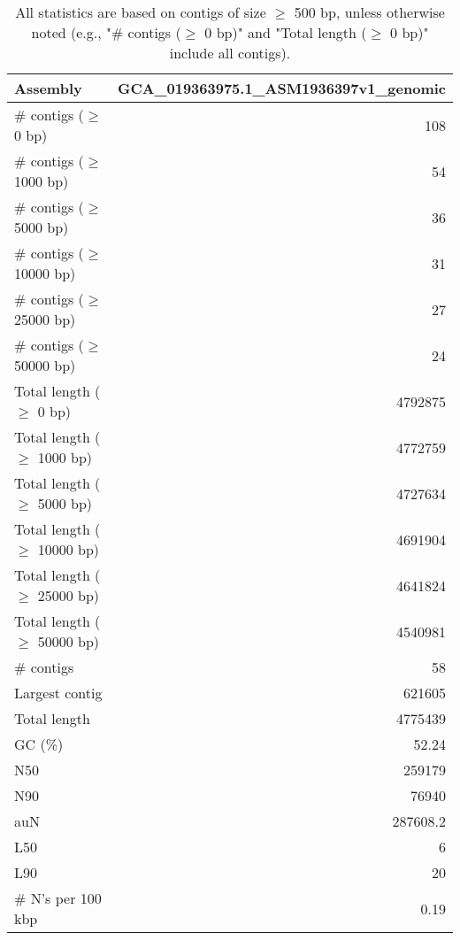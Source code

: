 \documentclass[12pt,a4paper]{article}
\begin{document}
\begin{table}[ht]
\begin{center}
\caption{All statistics are based on contigs of size $\geq$ 500 bp, unless otherwise noted (e.g., "\# contigs ($\geq$ 0 bp)" and "Total length ($\geq$ 0 bp)" include all contigs).}
\begin{tabular}{|l*{1}{|r}|}
\hline
Assembly & GCA\_019363975.1\_ASM1936397v1\_genomic \\ \hline
\# contigs ($\geq$ 0 bp) & 108 \\ \hline
\# contigs ($\geq$ 1000 bp) & 54 \\ \hline
\# contigs ($\geq$ 5000 bp) & 36 \\ \hline
\# contigs ($\geq$ 10000 bp) & 31 \\ \hline
\# contigs ($\geq$ 25000 bp) & 27 \\ \hline
\# contigs ($\geq$ 50000 bp) & 24 \\ \hline
Total length ($\geq$ 0 bp) & 4792875 \\ \hline
Total length ($\geq$ 1000 bp) & 4772759 \\ \hline
Total length ($\geq$ 5000 bp) & 4727634 \\ \hline
Total length ($\geq$ 10000 bp) & 4691904 \\ \hline
Total length ($\geq$ 25000 bp) & 4641824 \\ \hline
Total length ($\geq$ 50000 bp) & 4540981 \\ \hline
\# contigs & 58 \\ \hline
Largest contig & 621605 \\ \hline
Total length & 4775439 \\ \hline
GC (\%) & 52.24 \\ \hline
N50 & 259179 \\ \hline
N90 & 76940 \\ \hline
auN & 287608.2 \\ \hline
L50 & 6 \\ \hline
L90 & 20 \\ \hline
\# N's per 100 kbp & 0.19 \\ \hline
\end{tabular}
\end{center}
\end{table}
\end{document}
